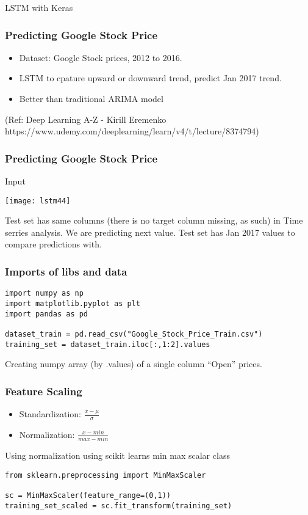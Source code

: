 \begin{frame}
  \begin{center}
    {\Large LSTM with Keras}
    

  \end{center}
\end{frame}

\begin{frame}[fragile] \frametitle{Predicting Google Stock Price}
\begin{itemize}
\item Dataset: Google Stock prices, 2012 to 2016.
\item LSTM to cpature upward or downward trend, predict Jan 2017 trend.
\item Better than traditional ARIMA model
\end{itemize}
(Ref: Deep Learning A-Z - Kirill Eremenko https://www.udemy.com/deeplearning/learn/v4/t/lecture/8374794)
\end{frame}



\begin{frame}[fragile] \frametitle{Predicting Google Stock Price}
Input
\begin{center}
\texttt{[image: lstm44]}
\end{center}
Test set has same columns (there is no target column missing, as such) in Time serries analysis. We are predicting next value. Test set has Jan 2017 values to compare predictions with.
\end{frame}


\begin{frame}[fragile] \frametitle{Imports of libs and data}

\begin{lstlisting}
import numpy as np
import matplotlib.pyplot as plt
import pandas as pd

dataset_train = pd.read_csv("Google_Stock_Price_Train.csv")
training_set = dataset_train.iloc[:,1:2].values
\end{lstlisting}
Creating numpy array (by .values) of a single column ``Open'' prices.
\end{frame}

\begin{frame}[fragile] \frametitle{Feature Scaling}
\begin{itemize}
\item Standardization: $\frac{x - \mu}{\sigma}$
\item Normalization: $\frac{x - min}{max - min}$
\end{itemize}
Using normalization using scikit learns min max scalar class
\begin{lstlisting}
from sklearn.preprocessing import MinMaxScaler

sc = MinMaxScaler(feature_range=(0,1))
training_set_scaled = sc.fit_transform(training_set)
\end{lstlisting}
\end{frame}


